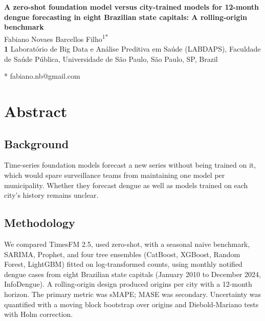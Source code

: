 \documentclass[10pt,letterpaper]{article}
\begin{document}
\vspace*{0.2in}

\begin{flushleft}
{\Large
\textbf{A zero-shot foundation model versus city-trained models for 12-month dengue forecasting in eight Brazilian state capitals: A rolling-origin benchmark}
}
\newline
\\
Fabiano Novaes Barcellos Filho\textsuperscript{1*}
\\
\bigskip
\textbf{1} Laborat\'orio de Big Data e An\'alise Preditiva em Sa\'ude (LABDAPS), Faculdade de Sa\'ude P\'ublica, Universidade de S\~ao Paulo, S\~ao Paulo, SP, Brazil
\\
\bigskip

* fabiano.nb@gmail.com

\end{flushleft}

\section*{Abstract}
\subsection*{Background}
Time-series foundation models forecast a new series without being trained on it, which would spare surveillance teams from maintaining one model per municipality. Whether they forecast dengue as well as models trained on each city's history remains unclear.

\subsection*{Methodology}
We compared TimesFM 2.5, used zero-shot, with a seasonal naive benchmark, SARIMA, Prophet, and four tree ensembles (CatBoost, XGBoost, Random Forest, LightGBM) fitted on log-transformed counts, using monthly notified dengue cases from eight Brazilian state capitals (January 2010 to December 2024, InfoDengue). A rolling-origin design produced  origins per city with a 12-month horizon. The primary metric was sMAPE; MASE was secondary. Uncertainty was quantified with a moving block bootstrap over origins and Diebold-Mariano tests with Holm correction.
\end{document}

